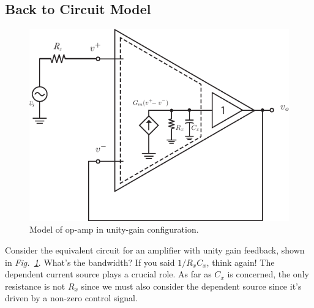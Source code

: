 \subsection{Back to Circuit Model}
\begin{figure}[tb]
\centering
\includegraphics[scale=1]{opamp_model_fb_unity}
\caption{Model of op-amp in unity-gain configuration.}
\label{fig:opamp_model_fb_unity}
\end{figure}
Consider the equivalent circuit for an amplifier with unity gain feedback, shown in \emph{Fig.~\ref{fig:opamp_model_fb_unity}}.  What's the bandwidth?  If you said $1/R_x C_x$, think again!  The dependent current source plays a crucial role.  As far as $C_x$ is concerned, the only resistance is not $R_x$ since we must also consider the dependent source since it's driven by a non-zero control signal.
